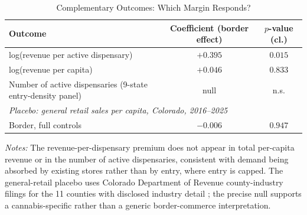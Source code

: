 \begin{table}[htbp]
\centering
\caption{Complementary Outcomes: Which Margin Responds?}
\label{tab:jrap_complementary}
\small
\begin{tabular}{p{6.8cm}cc}
\toprule
Outcome & Coefficient (border effect) & $p$-value (cl.) \\
\midrule
log(revenue per active dispensary) & $+0.395$ & $0.015$ \\
log(revenue per capita) & $+0.046$ & $0.833$ \\
Number of active dispensaries (9-state entry-density panel) & null & n.s. \\
\midrule
\multicolumn{3}{l}{\textit{Placebo: general retail sales per capita, Colorado, 2016--2025}} \\
Border, full controls & $-0.006$ & $0.947$ \\
\bottomrule
\end{tabular}
\begin{minipage}{0.95\textwidth}
\vspace{0.3em}
\footnotesize
\textit{Notes:} The revenue-per-dispensary premium does not appear in total per-capita revenue or in the
number of active dispensaries, consistent with demand being absorbed by existing stores rather than by
entry, where entry is capped. The general-retail placebo uses Colorado Department of Revenue county-industry
filings for the 11 counties with disclosed industry detail \citep{CDORRetailByCounty}; the precise null
supports a cannabis-specific rather than a generic border-commerce interpretation.
\end{minipage}
\end{table}

